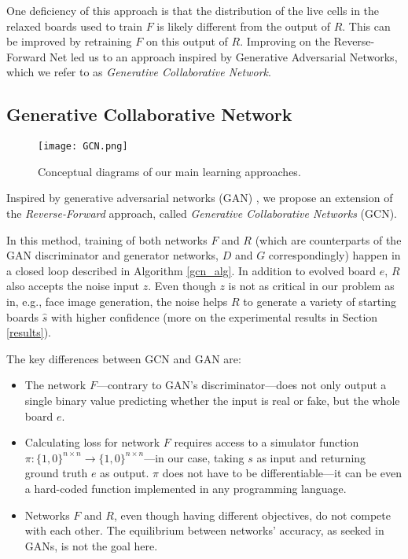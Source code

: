 \documentclass[conference]{IEEEtran}
\begin{document}
One deficiency of this approach is that the distribution of the live cells in the relaxed boards used to train $F$ is likely different from the output of $R$. This can be improved by retraining $F$ on this output of $R$. Improving on the Reverse-Forward Net led us to an approach inspired by Generative Adversarial Networks, which we refer to as \emph{Generative Collaborative Network}.

\subsection{Generative Collaborative Network}
\label{gcn}

\begin{figure}
    \centering
\texttt{[image: GCN.png]}
    \caption{Conceptual diagrams of our main learning approaches.}
    \label{fig:algo_concepts}
\end{figure}

Inspired by generative adversarial networks (GAN) \cite{goodfellow2014generative}, we propose an extension of the \emph{Reverse-Forward} approach, called \emph{Generative Collaborative Networks} (GCN).

In this method, training of both networks $F$ and $R$ (which are counterparts of the GAN discriminator and generator networks, $D$ and $G$ correspondingly) happen in a closed loop described in Algorithm \ref{gcn_alg}. In addition to evolved board $e$, $R$ also accepts the noise input $z$. Even though $z$ is not as critical in our problem as in, e.g., face image generation, the noise helps $R$ to generate a variety of starting boards $\hat s$ with higher confidence (more on the experimental results in Section \ref{results}). 

The key differences between GCN and GAN are:
\begin{itemize}
    \item The network $F$---contrary to GAN's discriminator---does not only output a single binary value predicting whether the input is real or fake, but the whole board $e$.
    \item Calculating loss for network $F$ requires access to a simulator function $\pi \colon \{1,0\}^{n\times n} \rightarrow \{1,0\}^{n\times n}$---in our case, taking $s$ as input and returning ground truth $e$ as output. $\pi$ does not have to be differentiable---it can be even a hard-coded function implemented in any programming language.
    \item Networks $F$ and $R$, even though having different objectives, do not compete with each other. The equilibrium between networks' accuracy, as seeked in GANs, is not the goal here.
\end{itemize}
\end{document}

